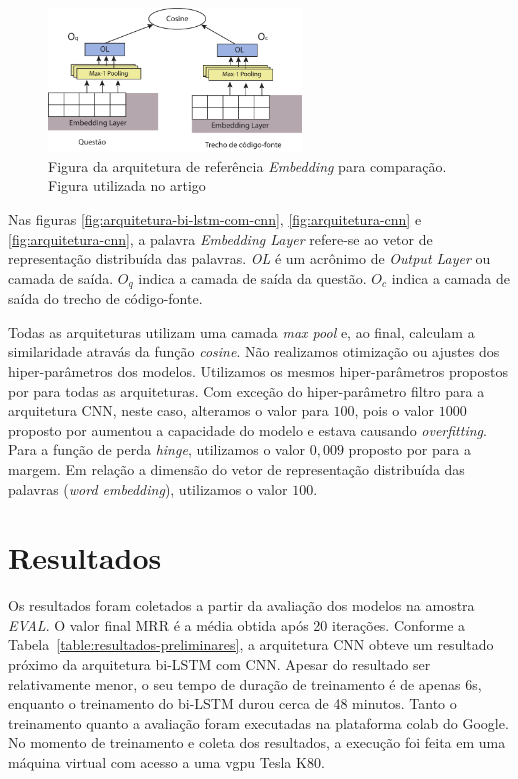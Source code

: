 \begin{figure}[h]
    \centering
    \includegraphics[width=0.6\textwidth]{figuras/cap-resultados-preliminares/ArquiteturaEmbedding.pdf}
    \caption{Figura da arquitetura de referência \textit{Embedding} para comparação. Figura utilizada no artigo \cite{marcelo-vem-2019}}
    \label{fig:arquitetura-embedding}
\end{figure}
Nas figuras \ref{fig:arquitetura-bi-lstm-com-cnn}, \ref{fig:arquitetura-cnn} e \ref{fig:arquitetura-cnn}, a palavra \textit{Embedding Layer} refere-se ao vetor de representação distribuída das palavras. \emph{OL} é um acrônimo de \textit{Output Layer} ou camada de saída. $O_{q}$ indica a camada de saída da questão. $O_{c}$ indica a camada de saída do trecho de código-fonte.

Todas as arquiteturas utilizam uma camada \textit{max pool} e, ao final, calculam a similaridade atravás da função \textit{cosine}.
Não realizamos otimização ou ajustes dos hiper-parâmetros dos modelos. Utilizamos os mesmos hiper-parâmetros propostos por \cite{tan-lstm-qa} para todas as arquiteturas. Com exceção do hiper-parâmetro filtro para a arquitetura CNN, neste caso, alteramos o valor para $100$, pois o valor $1000$ proposto por \cite{tan-lstm-qa} aumentou a capacidade do modelo e estava causando \textit{overfitting}. Para a função de perda \textit{hinge}, utilizamos o valor $0,009$ proposto por \cite{feng-2015} para a margem. Em relação a dimensão do vetor de representação distribuída das palavras (\textit{word embedding}), utilizamos o valor $100$.


\section{Resultados}

Os resultados foram coletados a partir da avaliação dos modelos na amostra \emph{EVAL}. O valor final MRR é a média obtida após 20 iterações. Conforme a Tabela~\ref{table:resultados-preliminares},  a arquitetura CNN obteve um resultado próximo da arquitetura bi-LSTM com CNN. Apesar do resultado ser relativamente menor, o seu tempo de duração de treinamento é de apenas 6s, enquanto o treinamento do bi-LSTM durou cerca de 48 minutos. Tanto o treinamento quanto a avaliação foram executadas na plataforma \Gls{colab} do Google. No momento de treinamento e coleta dos resultados, a execução foi feita em uma máquina virtual com acesso a uma \acrshort{vgpu} Tesla K80.

